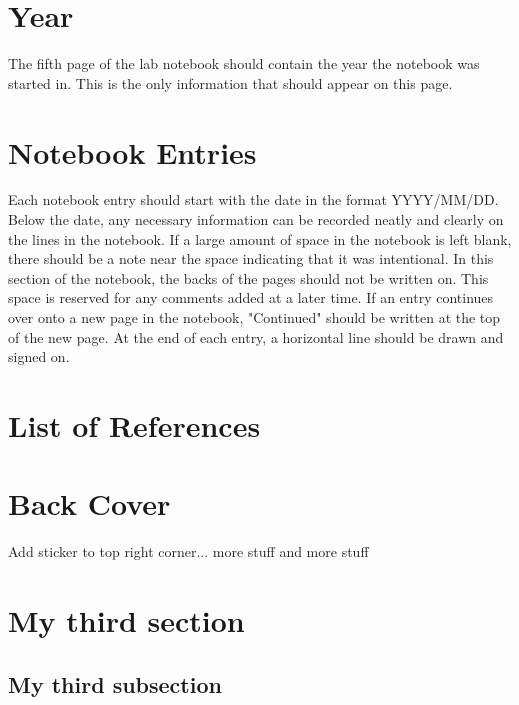\documentclass[11pt, oneside]{article}   	%
\begin{document}
\section{Year}

The fifth page of the lab notebook should contain the year the notebook was started in. This is the only information that should appear on this page.

\section{Notebook Entries}

Each notebook entry should start with the date in the format YYYY/MM/DD. Below the date, any necessary information can be recorded neatly and clearly on the lines in the notebook. If a large amount of space in the notebook is left blank, there should be a note near the space indicating that it was intentional. In this section of the notebook, the backs of the pages should not be written on. This space is reserved for any comments added at a later time. If an entry continues over onto a new page in the notebook, "Continued" should be written at the top of the new page. At the end of each entry, a horizontal line should be drawn and signed on. 

\section{List of References}
\section{Back Cover}	
Add sticker to top right corner...	
more stuff	and more stuff	%



\section{My third section}				%
\subsection{My third subsection}		%





\newpage							%

\end{document}
